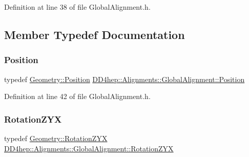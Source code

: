 Definition at line 38 of file Global\+Alignment.\+h.



\subsection{Member Typedef Documentation}
\hypertarget{class_d_d4hep_1_1_alignments_1_1_global_alignment_a9cd5167ec3a33a95ca76a9c7fe06271e}{}\label{class_d_d4hep_1_1_alignments_1_1_global_alignment_a9cd5167ec3a33a95ca76a9c7fe06271e} 
\subsubsection{\texorpdfstring{Position}{Position}}
{\footnotesize\ttfamily typedef \hyperlink{namespace_d_d4hep_1_1_geometry_a55083902099d03506c6db01b80404900}{Geometry\+::\+Position} \hyperlink{class_d_d4hep_1_1_alignments_1_1_global_alignment_a9cd5167ec3a33a95ca76a9c7fe06271e}{D\+D4hep\+::\+Alignments\+::\+Global\+Alignment\+::\+Position}\hspace{0.3cm}{\ttfamily [private]}}



Definition at line 42 of file Global\+Alignment.\+h.

\hypertarget{class_d_d4hep_1_1_alignments_1_1_global_alignment_af30b8cf1e2dbdfb67f6819ef88e02478}{}\label{class_d_d4hep_1_1_alignments_1_1_global_alignment_af30b8cf1e2dbdfb67f6819ef88e02478} 
\subsubsection{\texorpdfstring{Rotation\+Z\+YX}{RotationZYX}}
{\footnotesize\ttfamily typedef \hyperlink{namespace_d_d4hep_1_1_geometry_a24667b2b9c3cec3d5239828db4d52189}{Geometry\+::\+Rotation\+Z\+YX} \hyperlink{class_d_d4hep_1_1_alignments_1_1_global_alignment_af30b8cf1e2dbdfb67f6819ef88e02478}{D\+D4hep\+::\+Alignments\+::\+Global\+Alignment\+::\+Rotation\+Z\+YX}\hspace{0.3cm}{\ttfamily [private]}}



